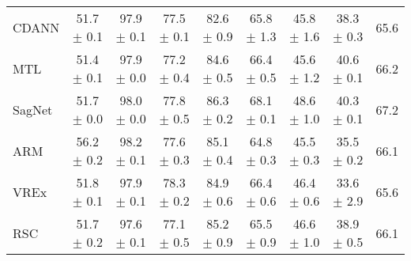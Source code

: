 \documentclass{article}
\begin{document}
\begin{center}
{\begin{tabular}{lcccccccc}
CDANN                     & 51.7 $\pm$ 0.1            & 97.9 $\pm$ 0.1            & 77.5 $\pm$ 0.1            & 82.6 $\pm$ 0.9            & 65.8 $\pm$ 1.3            & 45.8 $\pm$ 1.6            & 38.3 $\pm$ 0.3            & 65.6                      \\
MTL                       & 51.4 $\pm$ 0.1            & 97.9 $\pm$ 0.0            & 77.2 $\pm$ 0.4            & 84.6 $\pm$ 0.5            & 66.4 $\pm$ 0.5            & 45.6 $\pm$ 1.2            & 40.6 $\pm$ 0.1            & 66.2                      \\
SagNet                    & 51.7 $\pm$ 0.0            & 98.0 $\pm$ 0.0            & 77.8 $\pm$ 0.5            & 86.3 $\pm$ 0.2            & 68.1 $\pm$ 0.1            & 48.6 $\pm$ 1.0            & 40.3 $\pm$ 0.1            & 67.2                      \\
ARM                       & 56.2 $\pm$ 0.2            & 98.2 $\pm$ 0.1            & 77.6 $\pm$ 0.3            & 85.1 $\pm$ 0.4            & 64.8 $\pm$ 0.3            & 45.5 $\pm$ 0.3            & 35.5 $\pm$ 0.2            & 66.1                      \\
VREx                      & 51.8 $\pm$ 0.1            & 97.9 $\pm$ 0.1            & 78.3 $\pm$ 0.2            & 84.9 $\pm$ 0.6            & 66.4 $\pm$ 0.6            & 46.4 $\pm$ 0.6            & 33.6 $\pm$ 2.9            & 65.6                      \\
RSC                       & 51.7 $\pm$ 0.2            & 97.6 $\pm$ 0.1            & 77.1 $\pm$ 0.5            & 85.2 $\pm$ 0.9            & 65.5 $\pm$ 0.9            & 46.6 $\pm$ 1.0            & 38.9 $\pm$ 0.5            & 66.1                      \\
\bottomrule
\end{tabular}}
\end{center}
\end{document}
